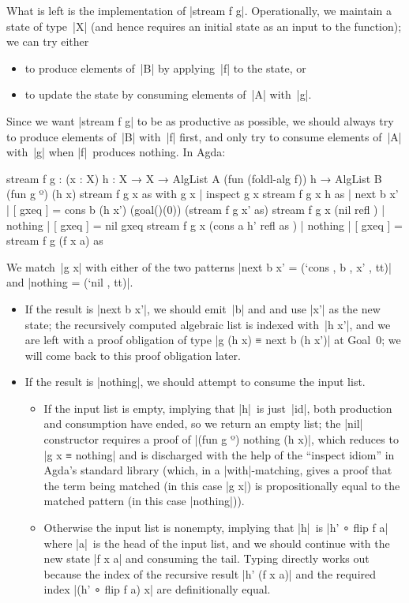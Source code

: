 What is left is the implementation of |stream f g|.
Operationally, we maintain a state of type~|X| (and hence requires an initial state as an input to the function); we can try either
\begin{itemize}
\item to produce elements of~|B| by applying~|f| to the state, or
\item to update the state by consuming elements of~|A| with~|g|.
\end{itemize}
Since we want |stream f g| to be as productive as possible, we should always try to produce elements of~|B| with~|f| first, and only try to consume elements of~|A| with~|g| when |f|~produces nothing.
In Agda:
\begin{code}
stream f g :  (x : X) {h : X → X} →
              AlgList A (fun (foldl-alg f)) h → AlgList B (fun g º) (h x)
stream f g x      as                      with g x     | inspect g x
stream f g x {h}  as                      | next b x'  | [ gxeq ] =  cons b (h x') (goal()(0))
                                                                       (stream f g x' as)
stream f g x      (nil        refl     )  | nothing    | [ gxeq ] =  nil gxeq
stream f g x      (cons a h'  refl as  )  | nothing    | [ gxeq ] =  stream f g (f x a) as
\end{code}
We match~|g x| with either of the two patterns |next b x' = (`cons , b , x' , tt)| and |nothing = (`nil , tt)|.
\begin{itemize}
\item If the result is |next b x'|, we should emit~|b| and and use |x'| as the new state; the recursively computed algebraic list is indexed with~|h x'|, and we are left with a proof obligation of type |g (h x) ≡ next b (h x')| at Goal~0; we will come back to this proof obligation later.
\item If the result is |nothing|, we should attempt to consume the input list.
\begin{itemize}
\item If the input list is empty, implying that |h|~is just~|id|, both production and consumption have ended, so we return an empty list; the |nil| constructor requires a proof of |(fun g º) nothing (h x)|, which reduces to |g x ≡ nothing| and is discharged with the help of the ``inspect idiom'' in Agda's standard library (which, in a |with|-matching, gives a proof that the term being matched (in this case |g x|) is propositionally equal to the matched pattern (in this case |nothing|)).
\item Otherwise the input list is nonempty, implying that |h|~is |h' ∘ flip f a| where |a|~is the head of the input list, and we should continue with the new state |f x a| and consuming the tail.
Typing directly works out because the index of the recursive result |h' (f x a)| and the required index |(h' ∘ flip f a) x| are definitionally equal.
\end{itemize}
\end{itemize}
